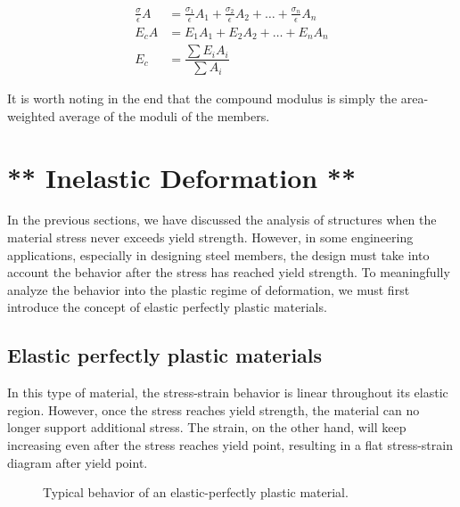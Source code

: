 \documentclass[
10pt,
a4paper,
openany,
svgnames,
]{kaobook} %
\begin{document}
\begin{align}
  \label{eq: compound modulus}
  \frac{\sigma}{\epsilon} A &= \frac{\sigma_1}{\epsilon} A_1 + \frac{\sigma_2}{\epsilon} A_2 + \ldots + \frac{\sigma_n}{\epsilon} A_n \nonumber \\
  E_cA &= E_1 A_1 + E_2A_2 + \ldots + E_nA_n \nonumber \\
  E_c &= \dfrac{\sum E_iA_i}{\sum A_i}
\end{align}

It is worth noting in the end that the compound modulus is simply the area-weighted average of the moduli of the members.

\section{** Inelastic Deformation **}

In the previous sections, we have discussed the analysis of structures when the material stress never exceeds yield strength. However, in some engineering applications, especially in designing steel members, the design must take into account the behavior after the stress has reached yield strength. To meaningfully analyze the behavior into the plastic regime of deformation, we must first introduce the concept of elastic perfectly plastic materials.

\subsection{Elastic perfectly plastic materials}

In this type of material, the stress-strain behavior is linear throughout its elastic region. However, once the stress reaches yield strength, the material can no longer support additional stress. The strain, on the other hand, will keep increasing even after the stress reaches yield point, resulting in a flat stress-strain diagram after yield point.

\begin{figure}[h]
  \centering
  \caption{Typical behavior of an elastic-perfectly plastic material.}
\end{figure}
\end{document}
